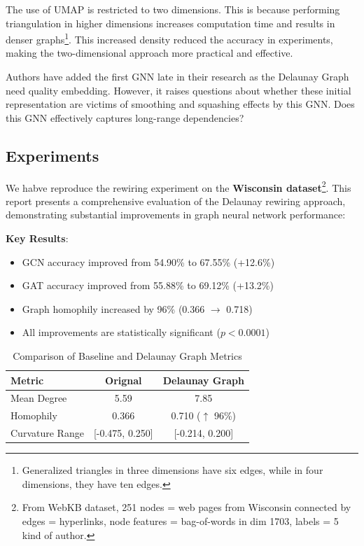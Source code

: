 \documentclass{article}
\theoremstyle{plain}
\theoremstyle{definition}
\theoremstyle{remark}
\begin{document}
The use of UMAP is restricted to two dimensions. This is because performing 
triangulation in higher dimensions increases computation time and 
results in denser graphs\footnote{Generalized triangles in three dimensions
 have six edges, while in four dimensions, they have ten edges.}. 
This increased density reduced the accuracy in experiments, making the two-dimensional approach more practical and effective.

Authors have added the first GNN late in their research as the Delaunay Graph 
need quality embedding. However, it raises questions about whether these initial
representation are victims of smoothing and squashing effects by this GNN.
Does this GNN effectively captures long-range dependencies?


\subsection{Experiments}
We habve reproduce the rewiring experiment on the \textbf{Wisconsin dataset}\footnote{
From WebKB dataset, 251 nodes = web pages from Wisconsin connected
by edges = hyperlinks, node features = bag-of-words in dim 1703, labels =  5 kind of author.}.
This report presents a comprehensive evaluation of the Delaunay rewiring 
approach, demonstrating substantial improvements in graph neural network performance:

\textbf{Key Results}:
\begin{itemize}
    \item GCN accuracy improved from 54.90\% to 67.55\% (+12.6\%)
    \item GAT accuracy improved from 55.88\% to 69.12\% (+13.2\%)
    \item Graph homophily increased by 96\% (0.366 $\to$ 0.718)
    \item All improvements are statistically significant ($p < 0.0001$)
\end{itemize}

\begin{table}[h!]
\caption{Comparison of Baseline and Delaunay Graph Metrics}
\centering
\begin{tabular}{|l|c|c|}
\hline
\textbf{Metric}          & \textbf{Orignal} & \textbf{Delaunay Graph} \\ \hline
Mean Degree              & 5.59                   & 7.85               \\ \hline
Homophily                & 0.366                  & 0.710 ($\uparrow$ 96\%) \\ \hline
Curvature Range          & [-0.475, 0.250]        & [-0.214, 0.200]         \\ \hline
\end{tabular}



\label{tab:graph_comparison}
\end{table}
    
\end{document}
